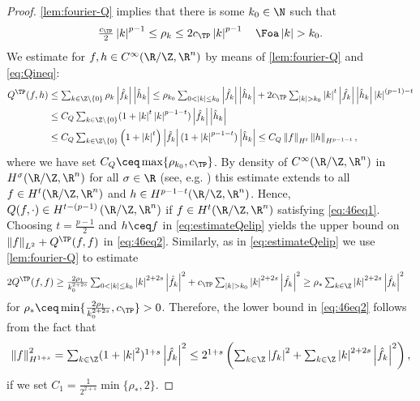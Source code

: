 \begin{proof}
    \cref{lem:fourier-Q} implies that there is some $ k_0\in\N $ such that 
    \begin{equation}\label{eq:Qineq}\textstyle
        \frac{c_{\TP}}{2}\left|k \right|^{p-1}\le \rho_k\le 2 c_{\TP}\left|k \right|^{p-1} \quad \Foa \left|k \right|> k_0.
    \end{equation}
    We estimate for $ f,h\in C^\infty(\R/\Z,\R^n) $ by means of \cref{lem:fourier-Q} and \cref{eq:Qineq}: 
    \begin{equation}\label{eq:estimateQelip}
    \begin{aligned}
        Q^{\TP}(f,h)
         &\textstyle\le \sum_{k\in\Z\setminus\{0\}}\rho_{k}\left|\hat{f}_{k} \right|\left|\hat{h}_{k} \right|
        \le\rho_{k_0}\sum_{0<\left|k \right|\le k_0}\left|\hat{f}_{k} \right|\left|\hat{h}_{k} \right|+2c_{\TP}\sum_{\left|k \right|>k_0}\left|k \right|^{t}\left|\hat{f}_{k} \right|\left|\hat{h}_{k} \right|\left|k \right|^{(p-1)-t}\\
        &\textstyle\le C_Q \sum_{k\in\Z\setminus\{0\}}( 1+\left|k \right|^t\left|k \right|^{p-1-t} )\left|\hat{f}_{k} \right|\left|\hat{h}_{k} \right|\\
        &\textstyle\le C_Q \sum_{k\in\Z\setminus\{0\}}\left( 1+\left|k \right|^t \right)\left|\hat{f}_{k} \right|( 1+\left|k \right|^{p-1-t} )\left|\hat{h}_{k} \right|
        \le C_Q \left\|f \right\|_{H^t}\left\|h \right\|_{H^{p-1-t}},
    \end{aligned}
    \end{equation}
    where we have set $ C_Q\ceq\max\{\rho_{k_0},c_{\TP}\} $.
     By density of $ C^\infty(\R/\Z,\R^n) $ in $ H^{\sigma}(\R/\Z,\R^n) $ for all $ \sigma\in \R $ (see, e.g. \cite[Statement 4 in Section 2.3]{AgranovichSobolevSpaces2015}) this estimate extends to all $ f\in H^{t}(\R/\Z,\R^n) $ and $ h\in H^{p-1-t}(\R/\Z,\R^n) $. 
    Hence, $ Q(f,\cdot)\in H^{t-(p-1)} \left( \R/\Z,\R^n \right)$ if $ f\in H^t(\R/\Z,\R^n) $ 
    satisfying \cref{eq:46eq1}. Choosing $ t=\frac{p-1}{2} $ and $ h\ceq f $ in \cref{eq:estimateQelip} yields the upper bound on $ \left\|f \right\|_{L^2} +Q^{\TP}(f,f)$ in \cref{eq:46eq2}. 
    Similarly, as in \cref{eq:estimateQelip} we use \cref{lem:fourier-Q} to estimate  
   \begin{align*}
     2Q^{\TP}(f,f)&\textstyle\ge \frac{2\rho_1}{k_0^{2+2s}}\sum_{0<\left|k \right|\le k_0}\left| k \right|^{2+2s} \left|\hat{f}_{k} \right|^2+c_{\TP}\sum_{\left|k \right|>k_0}\left|k \right|^{2+2s}\left|\hat{f}_{k} \right|^2
        \ge\rho_{*}\sum_{k\in\Z}\left|k \right|^{2+2s}\left|\hat{f}_{k} \right|^2
   \end{align*}
   for $ \rho_{*}\ceq \min\{\frac{2\rho_{1}}{k_0^{2+2s}},c_{\TP}\} >0$. Therefore, the lower bound in \cref{eq:46eq2} follows from the fact that 
   \begin{align*}\textstyle
    \left\|f \right\|_{H^{1+s}}^2=\sum_{k\in\Z}(1+\left|k \right|^2)^{1+s}\left|\hat{f}_{k} \right|^2 \le 2^{1+s}\left( \sum_{k\in\Z} \left|f_k \right|^2+\sum_{k\in \Z}\left|k \right|^{2+2s}\left|\hat{f}_{k} \right|^2\right),
   \end{align*}
   if we set $ C_1=\frac{1}{2^{2+s}}\min\{\rho_{*},2\} $. 


\end{proof}
